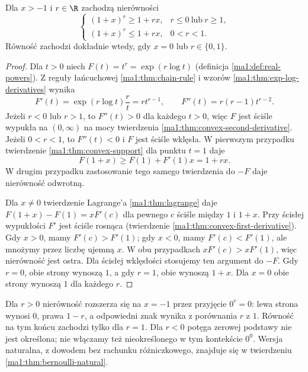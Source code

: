 \begin{twierdzenie}
\label{ma1:thm:bernoulli-real}
Dla $x>-1$ i $r\in\R$ zachodzą nierówności
\[
 \begin{cases}
 (1+x)^r\ge1+rx,& r\le0\ \text{lub}\ r\ge1,\\
 (1+x)^r\le1+rx,& 0<r<1.
 \end{cases}
\]
Równość zachodzi dokładnie wtedy, gdy $x=0$ lub $r\in\{0,1\}$.
\end{twierdzenie}
\begin{proof}
Dla $t>0$ niech $F(t)=t^r=\exp(r\log t)$ (definicja \ref{ma1:def:real-powers}). Z reguły łańcuchowej \ref{ma1:thm:chain-rule} i wzorów \ref{ma1:thm:exp-log-derivatives} wynika
\[
 F'(t)=\exp(r\log t)\frac{r}{t}=rt^{r-1},
 \qquad F''(t)=r(r-1)t^{r-2}.
\]
Jeżeli $r<0$ lub $r>1$, to $F''(t)>0$ dla każdego $t>0$, więc $F$ jest ściśle wypukła na $(0,\infty)$ na mocy twierdzenia \ref{ma1:thm:convex-second-derivative}. Jeżeli $0<r<1$, to $F''(t)<0$ i $F$ jest ściśle wklęsła. W pierwszym przypadku twierdzenie \ref{ma1:thm:convex-support} dla punktu $t=1$ daje
\[
 F(1+x)\ge F(1)+F'(1)x=1+rx.
\]
W drugim przypadku zastosowanie tego samego twierdzenia do $-F$ daje nierówność odwrotną.

Dla $x\ne0$ twierdzenie Lagrange'a \ref{ma1:thm:lagrange} daje $F(1+x)-F(1)=xF'(c)$ dla pewnego $c$ ściśle między $1$ i $1+x$. Przy ścisłej wypukłości $F'$ jest ściśle rosnąca (twierdzenie \ref{ma1:thm:convex-first-derivative}). Gdy $x>0$, mamy $F'(c)>F'(1)$; gdy $x<0$, mamy $F'(c)<F'(1)$, ale mnożymy przez liczbę ujemną $x$. W obu przypadkach $xF'(c)>xF'(1)$, więc nierówność jest ostra. Dla ścisłej wklęsłości stosujemy ten argument do $-F$. Gdy $r=0$, obie strony wynoszą $1$, a gdy $r=1$, obie wynoszą $1+x$. Dla $x=0$ obie strony wynoszą $1$ dla każdego $r$.
\end{proof}
Dla $r>0$ nierówność rozszerza się na $x=-1$ przez przyjęcie $0^r=0$: lewa strona wynosi $0$, prawa $1-r$, a odpowiedni znak wynika z porównania $r$ z $1$. Równość na tym końcu zachodzi tylko dla $r=1$. Dla $r<0$ potęga zerowej podstawy nie jest określona; nie włączamy też nieokreślonego w tym kontekście $0^0$. Wersja naturalna, z dowodem bez rachunku różniczkowego, znajduje się w twierdzeniu \ref{ma1:thm:bernoulli-natural}.

